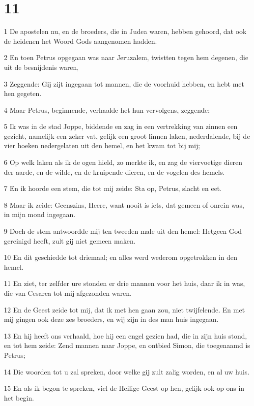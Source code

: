 \chapter{11}

\par 1 De apostelen nu, en de broeders, die in Judea waren, hebben gehoord, dat ook de heidenen het Woord Gods aangenomen hadden.
\par 2 En toen Petrus opgegaan was naar Jeruzalem, twistten tegen hem degenen, die uit de besnijdenis waren,
\par 3 Zeggende: Gij zijt ingegaan tot mannen, die de voorhuid hebben, en hebt met hen gegeten.
\par 4 Maar Petrus, beginnende, verhaalde het hun vervolgens, zeggende:
\par 5 Ik was in de stad Joppe, biddende en zag in een vertrekking van zinnen een gezicht, namelijk een zeker vat, gelijk een groot linnen laken, nederdalende, bij de vier hoeken nedergelaten uit den hemel, en het kwam tot bij mij;
\par 6 Op welk laken als ik de ogen hield, zo merkte ik, en zag de viervoetige dieren der aarde, en de wilde, en de kruipende dieren, en de vogelen des hemels.
\par 7 En ik hoorde een stem, die tot mij zeide: Sta op, Petrus, slacht en eet.
\par 8 Maar ik zeide: Geenszins, Heere, want nooit is iets, dat gemeen of onrein was, in mijn mond ingegaan.
\par 9 Doch de stem antwoordde mij ten tweeden male uit den hemel: Hetgeen God gereinigd heeft, zult gij niet gemeen maken.
\par 10 En dit geschiedde tot driemaal; en alles werd wederom opgetrokken in den hemel.
\par 11 En ziet, ter zelfder ure stonden er drie mannen voor het huis, daar ik in was, die van Cesarea tot mij afgezonden waren.
\par 12 En de Geest zeide tot mij, dat ik met hen gaan zou, niet twijfelende. En met mij gingen ook deze zes broeders, en wij zijn in des man huis ingegaan.
\par 13 En hij heeft ons verhaald, hoe hij een engel gezien had, die in zijn huis stond, en tot hem zeide: Zend mannen naar Joppe, en ontbied Simon, die toegenaamd is Petrus;
\par 14 Die woorden tot u zal spreken, door welke gij zult zalig worden, en al uw huis.
\par 15 En als ik begon te spreken, viel de Heilige Geest op hen, gelijk ook op ons in het begin.
